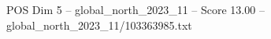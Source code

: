 \begin{textsample}{POS Dim 5 – global\_north\_2023\_11 – Score 13.00 – global\_north\_2023\_11/103363985.txt}
\end{textsample}
